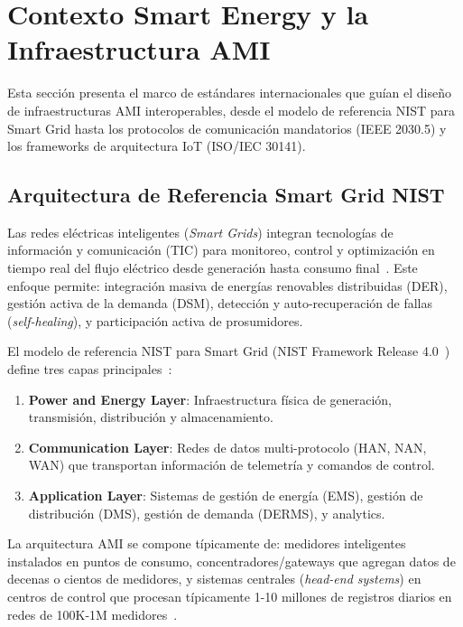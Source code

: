 \section{Contexto Smart Energy y la Infraestructura AMI}
\label{sec:marco-smart-energy}

Esta sección presenta el marco de estándares internacionales que guían el diseño de infraestructuras AMI interoperables, desde el modelo de referencia NIST para Smart Grid hasta los protocolos de comunicación mandatorios (IEEE 2030.5) y los frameworks de arquitectura IoT (ISO/IEC 30141).

\subsection{Arquitectura de Referencia Smart Grid NIST}
\label{sec:marco-nist-framework}

Las redes eléctricas inteligentes (\textit{Smart Grids}) integran tecnologías de información y comunicación (TIC) para monitoreo, control y optimización en tiempo real del flujo eléctrico desde generación hasta consumo final~\cite{SmartHomeEnergy2024,velasquezSmartGridsEmpowered2024,gungorSmartGridTechnologies2011}. Este enfoque permite: integración masiva de energías renovables distribuidas (DER), gestión activa de la demanda (DSM), detección y auto-recuperación de fallas (\textit{self-healing}), y participación activa de prosumidores.

El modelo de referencia NIST para Smart Grid (NIST Framework Release 4.0~\cite{NISTFramework2022}) define tres capas principales~\cite{alsuwaidiSecuringSmartGrid2024}:

\begin{enumerate}
\item \textbf{Power and Energy Layer}: Infraestructura física de generación, transmisión, distribución y almacenamiento.
\item \textbf{Communication Layer}: Redes de datos multi-protocolo (HAN, NAN, WAN) que transportan información de telemetría y comandos de control.
\item \textbf{Application Layer}: Sistemas de gestión de energía (EMS), gestión de distribución (DMS), gestión de demanda (DERMS), y analytics.
\end{enumerate}

La arquitectura AMI se compone típicamente de: medidores inteligentes instalados en puntos de consumo, concentradores/gateways que agregan datos de decenas o cientos de medidores, y sistemas centrales (\textit{head-end systems}) en centros de control que procesan típicamente 1-10 millones de registros diarios en redes de 100K-1M medidores~\cite{alsafranChallengesImplementingIoT2025}.

